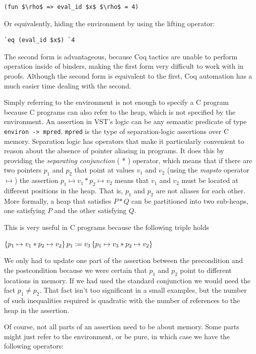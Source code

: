 \documentclass{puthesis}
\begin{document}
\begin{lstlisting}
(fun $\rho$ => eval_id $x$ $\rho$ = 4)
\end{lstlisting}

Or equivalently, hiding the environment by using the lifting operator:

\begin{lstlisting}
`eq (eval_id $x$) `4
\end{lstlisting}

The second form is advantageous, because Coq tactics are unable to
perform operation inside of binders, making the first form very
difficult to work with in proofs. Although the second form is
equivalent to the first, Coq automation has a much easier time dealing
with the second.

Simply referring to the environment is not enough to specify a C
program because C programs can also refer to the heap, which is not
specified by the environment. An assertion in
VST's logic can be any semantic predicate of type 
\lstinline|environ -> mpred|.  \lstinline|mpred| is the type of separation-logic
assertions over C memory. Separation logic has operators that make it
particularly convenient to reason about the absence of pointer
aliasing in programs. It does this by providing the 
\emph{separating conjunction} ( * ) operator, which means that if there are two
pointers $p_1$ and $p_2$ that point at values $v_1$ and $v_2$ (using
the \emph{mapsto} operator $\mapsto$) the assertion $p_1 \mapsto v_1 *
p_2 \mapsto v_2$ means that $v_1$ and $v_2$ must be located at
different positions in the heap. That is, $p_1$ and $p_2$ are not
aliases for each other. More formally, a heap that satisfies $P * Q$
can be partitioned into two sub-heaps, one satisfying $P$ and the
other satisfying $Q$.

This is very useful in C programs because the following triple holds

$\{p_1 \mapsto v_1 * p_2 \mapsto v_2\}\,p_1 := v_3\,\{p_1 \mapsto v_3 * p_2 \mapsto v_2\}$

We only had to update one part of the assertion between the
precondition and the postcondition because we were
certain that $p_1$ and $p_2$ point to different locations in memory. If
we had used the standard conjunction we would need the fact
$p_1 \neq p_2$. That fact isn't too significant in a small examples, but the
number of such inequalities required is quadratic with
the number of references to the heap in the assertion. 

Of course, not all parts of an assertion need to be about memory. Some
parts might just refer to the environment, or be pure, in which case we
have the following operators:
\end{document}
